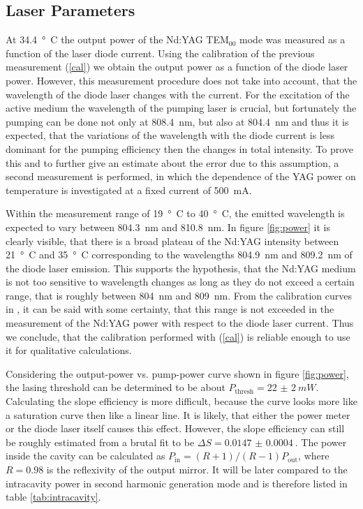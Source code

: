 \documentclass[a4paper]{scrartcl}
\numberwithin{equation}{section}
\numberwithin{figure}{section}
\numberwithin{table}{section}
\newcommand{\Formel}[1]{(\ref{#1})}
\begin{document}
\subsection{Laser Parameters}
At \SI{34.4}{\degree C} the output power of the Nd:YAG  TEM$_00$ mode was measured as a function of the laser diode current. Using the calibration of the previous measurement \Formel{cal} we obtain the output power as a function of the diode laser power. However, this measurement procedure does not take into account, that the wavelength of the diode laser changes with the current. For the excitation of the active medium the wavelength of the pumping laser is crucial, but fortunately the pumping can be done not only at \SI{808.4}{nm}, but also at \SI{804.4}{nm} and thus it is expected, that the variations of the wavelength with the diode current is less dominant for the pumping efficiency then the changes in total intensity. To prove this and to further give an estimate about the error due to this assumption, a second measurement is performed, in which the dependence of the YAG power on temperature is investigated at a fixed current of \SI{500}{mA}. 

Within the measurement range of \SI{19}{ \degree C} to \SI{40}{\degree  C}, the emitted wavelength is expected to vary between \SI{804.3}{nm} and \SI{810.8}{nm}. In figure \ref{fig:power} it is clearly visible, that there is a broad plateau of the Nd:YAG intensity between \SI{21}{\degree C} and \SI{35}{\degree C} corresponding to the wavelengths \SI{804.9}{nm} and \SI{809.2}{nm} of the diode laser emission. This supports the hypothesis, that the Nd:YAG medium is not too sensitive to wavelength changes as long as they do not exceed a certain range, that is roughly between \SI{804}{nm} and \SI{809}{nm}. From the calibration curves in \cite{script}, it can be said with some certainty, that this range is not exceeded in the measurement of the Nd:YAG power with respect to the diode laser current. Thus we conclude, that the calibration performed with \Formel{cal} is reliable enough to use it for qualitative calculations.

Considering the output-power vs. pump-power curve shown in figure \ref{fig:power}, the lasing threshold can be determined to be about $P_\text{thresh}=\SI{22(2)}{mW}$. Calculating the slope efficiency is more difficult, because the curve looks more like a saturation curve then like a linear line. It is likely, that either the power meter or the diode laser itself causes this effect. However, the slope efficiency can still be roughly estimated from a brutal fit to be $\Delta S = \SI{0.0147(4)}{}$. The power inside the cavity can be calculated as $P_\text{in}=(R+1)/(R-1) P_\text{out}$, where $R=0.98$ is the reflexivity of the output mirror. It will be later compared to the intracavity power in second harmonic generation mode and is therefore listed in table \ref{tab:intracavity}.
\end{document}
